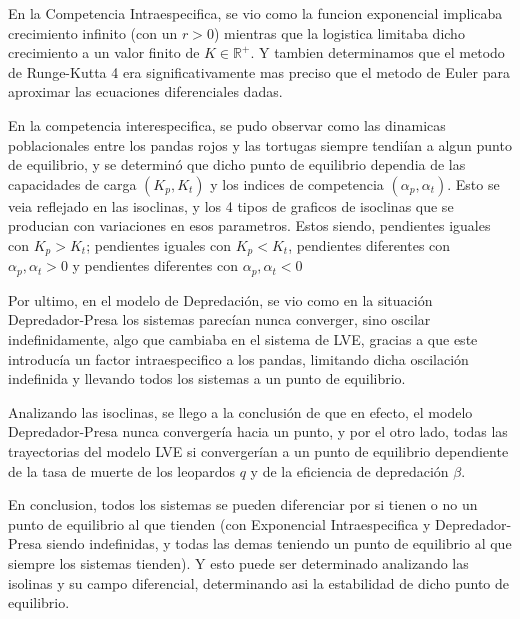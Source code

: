\documentclass{article}
\begin{document}
\noindent En la Competencia Intraespecifica, se vio como la funcion exponencial implicaba crecimiento infinito (con un $r > 0$) mientras que la logistica limitaba dicho crecimiento a un valor finito de $K \in \mathbb{R}^+$. Y tambien determinamos que el metodo de Runge-Kutta 4 era significativamente mas preciso que el metodo de Euler para aproximar las ecuaciones diferenciales dadas. \vspace{2\baselineskip}

\noindent En la competencia interespecifica, se pudo observar como las dinamicas poblacionales entre los pandas rojos y las tortugas siempre tendiían a algun punto de equilibrio, y se determinó que dicho punto de equilibrio dependia de las capacidades de carga $(K_p, K_t)$ y los indices de competencia $(\alpha_p, \alpha_t)$. Esto se veia reflejado en las isoclinas, y los 4 tipos de graficos de isoclinas que se producian con variaciones en esos parametros. Estos siendo, pendientes iguales con $K_p > K_t$; pendientes iguales con $K_p < K_t$, pendientes diferentes con $\alpha_p, \alpha_t > 0$ y pendientes diferentes con $\alpha_p, \alpha_t < 0$ \vspace{2\baselineskip}

\noindent Por ultimo, en el modelo de Depredación, se vio como en la situación Depredador-Presa los sistemas parecían nunca converger, sino oscilar indefinidamente, algo que cambiaba en el sistema de LVE, gracias a que este introducía un factor intraespecifico a los pandas, limitando dicha oscilación indefinida y llevando todos los sistemas a un punto de equilibrio. \vspace{0.4\baselineskip}

\noindent Analizando las isoclinas, se llego a la conclusión de que en efecto, el modelo Depredador-Presa nunca convergería hacia un punto, y por el otro lado, todas las trayectorias del modelo LVE si convergerían a un punto de equilibrio dependiente de la tasa de muerte de los leopardos $q$ y de la eficiencia de depredación $\beta$. \vspace{2\baselineskip}

\noindent En conclusion, todos los sistemas se pueden diferenciar por si tienen o no un punto de equilibrio al que tienden (con Exponencial Intraespecifica y Depredador-Presa siendo indefinidas, y todas las demas teniendo un punto de equilibrio al que siempre los sistemas tienden). Y esto puede ser determinado analizando las isolinas y su campo diferencial, determinando asi la estabilidad de dicho punto de equilibrio. \vspace{0.75\baselineskip}
\end{document}
